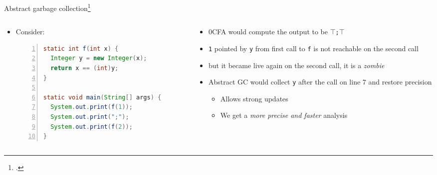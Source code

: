 \documentclass[aspectratio=169,notes]{beamer}
\begin{document}
\begin{frame}[fragile]{Abstract garbage collection\footcite{might2006improving}}
  \small\vspace{-1em}
  \begin{columns}[t]
    \begin{column}{.40\textwidth}
        \begin{itemize}
        \item Consider:
          \begin{lstlisting}[language=Java,numbers=left]
static int f(int x) {
  Integer y = new Integer(x);
  return x == (int)y;
}

static void main(String[] args) {
  System.out.print(f(1));
  System.out.print(";");
  System.out.print(f(2));
}
          \end{lstlisting}
        \end{itemize}
    \end{column}
    \begin{column}{.60\textwidth}
      \pause
      \begin{itemize}[<+->]
      \item 0CFA would compute the output to be \alert<2>{\texttt{$\top$;$\top$}}
      \item \texttt{1} pointed by \texttt{y} from first call to \texttt{f} is not reachable on the second call
      \item but it became live again on the second call, it is a \emph{zombie}
      \item Abstract GC would collect \texttt{y} after the call on line 7 and restore precision \pause
        \begin{itemize}[<+->] \footnotesize
        \item Allows strong updates
        \item We get a \alert{\emph{more precise and faster}} analysis
        \end{itemize}
      \end{itemize}
    \end{column}
  \end{columns}
\end{frame}

\end{document}
